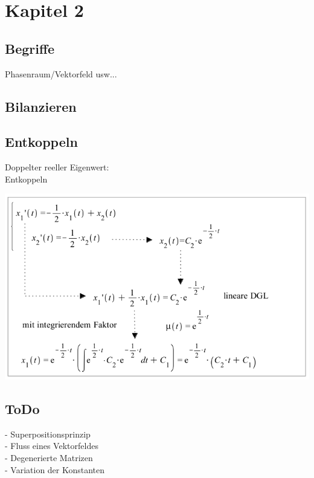 \section{Kapitel 2}

\subsection{Begriffe}
Phasenraum/Vektorfeld usw...
\subsection{Bilanzieren}


\subsection{Entkoppeln}
\begin{minipage}[h]{0.35\textwidth}
Doppelter reeller Eigenwert:\\ Entkoppeln
\end{minipage}
\begin{minipage}[h]{0.5\textwidth}
	\includegraphics[width=1.0\textwidth]{images/Entkoppeln.png}
\end{minipage}

\subsection{ToDo}
- Superpositionsprinzip\\
- Fluss eines Vektorfeldes\\
- Degenerierte Matrizen\\
- Variation der Konstanten\\
